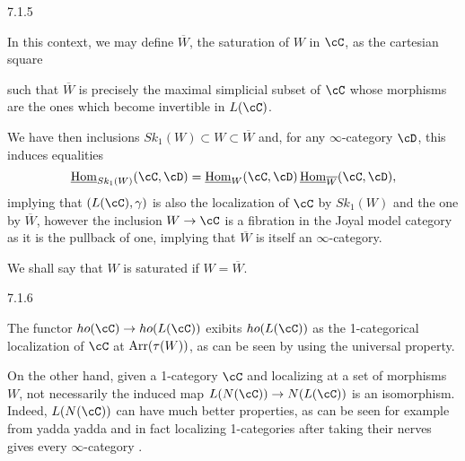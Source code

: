\documentclass[a4paper,12pt]{scrartcl}
\begin{document}
\begin{rmk}
  7.1.5

  In this context, we may define $\overline{W}$, the saturation of $W$ in $\cC$,
  as the cartesian square

  such that $\overline{W}$ is precisely the maximal simplicial subset of $\cC$
  whose morphisms are the ones which become invertible in $L(\cC)$.

  We have then inclusions $Sk_1(W)\subset W\subset\overline{W}$ and, for any
  $\infty$-category $\cD$, this induces equalities
  \[\Home_{Sk_1(W)}(\cC,\cD)=\Home_{W}(\cC,\cD)\Home_{\overline{W}}(\cC,\cD),\]
  implying that $(L(\cC),\gamma)$ is also the localization of $\cC$ by $Sk_1(W)$
  and the one by $\overline{W}$, however the inclusion $W\rightarrow\cC$ is a
  fibration in the Joyal model category as it is the pullback of one, implying
  that $\overline{W}$ is itself an $\infty$-category.

  We shall say that $W$ is saturated if $W=\overline{W}$.
\end{rmk}

\begin{rmk}
  7.1.6

  The functor $ho(\cC)\rightarrow ho(L(\cC))$ exibits $ho(L(\cC))$ as the
  1-categorical localization of $\cC$ at $\operatorname{Arr}(\tau(W))$, as can be seen by
  using the universal property.

  On the other hand, given a 1-category $\cC$ and localizing at a set of
  morphisms $W$, not necessarily the induced map $L(N(\cC))\rightarrow
  N(L(\cC))$ is an isomorphism. Indeed, $L(N(\cC))$ can have much better
  properties, as can be seen for example from yadda yadda  and in fact localizing 1-categories after taking
  their nerves gives every $\infty$-category .
\end{rmk}
\end{document}
